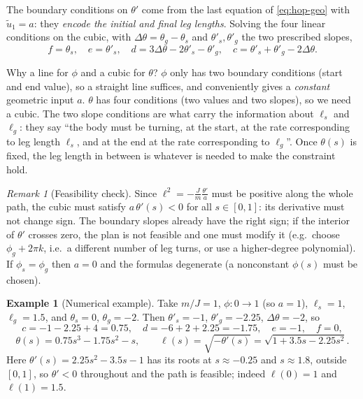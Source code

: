 \documentclass[11pt,a4paper]{article}
\theoremstyle{definition}
\newtheorem{example}[definition]{Example}
\theoremstyle{plain}
\theoremstyle{remark}
\newtheorem*{remark}{Remark}
\begin{document}
The boundary conditions on $\theta'$ come from the last equation of \eqref{eq:hop-geo} with $\tilde u_1=a$: they \emph{encode the initial and final leg lengths}. Solving the four linear conditions on the cubic, with $\Delta\theta=\theta_g-\theta_s$ and $\theta'_s,\theta'_g$ the two prescribed slopes,
\[
  f=\theta_s,\quad e=\theta'_s,\quad d=3\Delta\theta-2\theta'_s-\theta'_g,\quad c=\theta'_s+\theta'_g-2\Delta\theta .
\]

\begin{intuition}
Why a line for $\phi$ and a cubic for $\theta$? $\phi$ only has two boundary conditions (start and end value), so a straight line suffices, and conveniently gives a \emph{constant} geometric input $a$. $\theta$ has four conditions (two values and two slopes), so we need a cubic. The two slope conditions are what carry the information about $\ell_s$ and $\ell_g$: they say ``the body must be turning, at the start, at the rate corresponding to leg length $\ell_s$, and at the end at the rate corresponding to $\ell_g$''. Once $\theta(s)$ is fixed, the leg length in between is whatever is needed to make the constraint hold.
\end{intuition}

\begin{remark}[Feasibility check]
Since $\ell^2=-\frac{J}{m}\frac{\theta'}{a}$ must be positive along the whole path, the cubic must satisfy $a\,\theta'(s)<0$ for all $s\in[0,1]$: its derivative must not change sign. The boundary slopes already have the right sign; if the interior of $\theta'$ crosses zero, the plan is not feasible and one must modify it (e.g.\ choose $\phi_g+2\pi k$, i.e.\ a different number of leg turns, or use a higher-degree polynomial). If $\phi_s=\phi_g$ then $a=0$ and the formulas degenerate (a nonconstant $\phi(s)$ must be chosen).
\end{remark}

\begin{example}[Numerical example]
Take $m/J=1$, $\phi:0\to1$ (so $a=1$), $\ell_s=1$, $\ell_g=1.5$, and $\theta_s=0$, $\theta_g=-2$. Then $\theta'_s=-1$, $\theta'_g=-2.25$, $\Delta\theta=-2$, so
\[
  c=-1-2.25+4=0.75,\quad d=-6+2+2.25=-1.75,\quad e=-1,\quad f=0,
\]
\[
  \theta(s)=0.75s^3-1.75s^2-s,\qquad
  \ell(s)=\sqrt{-\theta'(s)}=\sqrt{1+3.5s-2.25s^2}.
\]
Here $\theta'(s)=2.25s^2-3.5s-1$ has its roots at $s\approx-0.25$ and $s\approx1.8$, outside $[0,1]$, so $\theta'<0$ throughout and the path is feasible; indeed $\ell(0)=1$ and $\ell(1)=1.5$.
\end{example}
\end{document}
